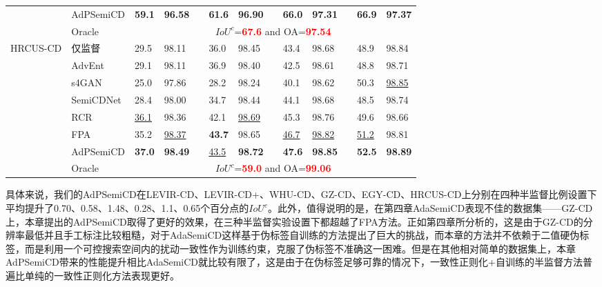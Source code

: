\documentclass[lang=chs, degree=master, blindreview=false, adobe=false]{yanputhesis}
\begin{document}
\begin{table}[!htbp]
{\begin{tabular}{p{20mm}p{25mm}p{8mm}p{8mm}cp{8mm}p{8mm}cp{8mm}p{8mm}cp{8mm}p{8mm}}
      \rowcolor{mycyan}
      \multirow{-8}{*}{\cellcolor{white}}& \cellcolor{white}AdPSemiCD   &   \textbf{59.1} & \textbf{96.58} && \textbf{61.6} & \textbf{96.90}  && \textbf{66.0} & \textbf{97.31} && \textbf{66.9} & \textbf{97.37} \\%
      \cline{2-13}
      & Oracle & \multicolumn{11}{c}{$ IoU^c$=\textcolor{red}{\bf 67.6} and OA=\textcolor{red}{\bf 97.54}} \\
      \bottomrule
      \multirow{8}{*}{HRCUS-CD}
      & 仅监督   &   29.5 & 98.11 && 36.0 & 98.45 && 43.4 & 98.68 && 48.9 & 98.84 \\ %
      & AdvEnt\cite{vu2019advent}& 29.1 & 98.11 && 36.9 & 98.40 && 42.5 & 98.61 && 48.8 & 98.71 \\ %
      & s4GAN\cite{mittal2019semi}& 25.0 & 97.86 && 28.2 & 98.24 && 40.1 & 98.62 && 50.3 & \underline{98.85} \\
      & SemiCDNet\cite{peng2021SemiCDNet} & 28.4 & 98.00 && 34.7 & 98.44 && 44.1 & 98.68 && 48.5 & 98.74 \\ %
      & RCR\cite{bandara2022RCR}& \underline{36.1} & 98.36 && 42.1 & \underline{98.69} && 45.3 & 98.76 && 49.6 & 98.66 \\

      & FPA\cite{Zhang2023FPA}& 35.2 & \underline{98.37} && \cellcolor{mycyan}\textbf{43.7} & 98.65 && \underline{46.7} & \underline{98.82} && \underline{51.2} & 98.81 \\

      \rowcolor{mycyan}
      \multirow{-8}{*}{\cellcolor{white}}& \cellcolor{white}AdPSemiCD   &  \textbf{37.0} & \cellcolor{mycyan}\textbf{98.49} && \cellcolor{white}\underline{43.5} & \textbf{98.72} && \textbf{47.6} & \textbf{98.85} && \textbf{52.5} & \textbf{98.89} \\%
      \cline{2-13}
      & Oracle & \multicolumn{11}{c}{$ IoU^c$=\textcolor{red}{\bf 59.0} and OA=\textcolor{red}{\bf 99.06}} \\
      \bottomrule
  \end{tabular}
  }
  \label{tab:AdP-building}
\end{table}

具体来说，我们的AdPSemiCD在LEVIR-CD、LEVIR-CD+、WHU-CD、GZ-CD、EGY-CD、HRCUS-CD上分别在四种半监督比例设置下平均提升了0.70、0.58、1.48、0.28、1.1、0.65个百分点的$IoU^c$。此外，值得说明的是，在第四章AdaSemiCD表现不佳的数据集——GZ-CD上，本章提出的AdPSemiCD取得了更好的效果，在三种半监督实验设置下都超越了FPA方法。正如第四章所分析的，这是由于GZ-CD的分辨率最低并且手工标注比较粗糙，对于AdaSemiCD这样基于伪标签自训练的方法提出了巨大的挑战，而本章的方法并不依赖于二值硬伪标签，而是利用一个可控搜索空间内的扰动一致性作为训练约束，克服了伪标签不准确这一困难。但是在其他相对简单的数据集上，本章AdPSemiCD带来的性能提升相比AdaSemiCD就比较有限了，这是由于在伪标签足够可靠的情况下，一致性正则化+自训练的半监督方法普遍比单纯的一致性正则化方法表现更好。
\end{document}
